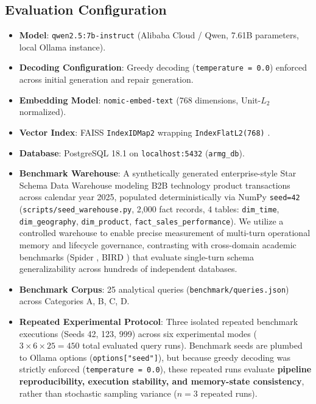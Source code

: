 \documentclass[conference]{IEEEtran}
\begin{document}
\subsection{Evaluation Configuration}
\begin{itemize}
    \item \textbf{Model}: \texttt{qwen2.5:7b-instruct} \cite{qwen2024qwen25} (Alibaba Cloud / Qwen, 7.61B parameters, local Ollama instance).
    \item \textbf{Decoding Configuration}: Greedy decoding (\texttt{temperature = 0.0}) enforced across initial generation and repair generation.
    \item \textbf{Embedding Model}: \texttt{nomic-embed-text} \cite{nussbaum2024nomic} (768 dimensions, Unit-$L_2$ normalized).
    \item \textbf{Vector Index}: FAISS \texttt{IndexIDMap2} wrapping \texttt{IndexFlatL2(768)} \cite{johnson2021faiss}.
    \item \textbf{Database}: PostgreSQL 18.1 on \texttt{localhost:5432} (\texttt{armg\_db}).
    \item \textbf{Benchmark Warehouse}: A synthetically generated enterprise-style Star Schema Data Warehouse modeling B2B technology product transactions across calendar year 2025, populated deterministically via NumPy \texttt{seed=42} (\texttt{scripts/seed\_warehouse.py}, 2,000 fact records, 4 tables: \texttt{dim\_time}, \texttt{dim\_geography}, \texttt{dim\_product}, \texttt{fact\_sales\_performance}). We utilize a controlled warehouse to enable precise measurement of multi-turn operational memory and lifecycle governance, contrasting with cross-domain academic benchmarks (Spider \cite{yu2018spider}, BIRD \cite{li2023bird}) that evaluate single-turn schema generalizability across hundreds of independent databases.
    \item \textbf{Benchmark Corpus}: 25 analytical queries (\texttt{benchmark/queries.json}) across Categories A, B, C, D.
    \item \textbf{Repeated Experimental Protocol}: Three isolated repeated benchmark executions (Seeds 42, 123, 999) across six experimental modes ($3 \times 6 \times 25 = 450$ total evaluated query runs). Benchmark seeds are plumbed to Ollama options (\texttt{options["seed"]}), but because greedy decoding was strictly enforced (\texttt{temperature = 0.0}), these repeated runs evaluate \textbf{pipeline reproducibility, execution stability, and memory-state consistency}, rather than stochastic sampling variance ($n = 3$ repeated runs).

\end{itemize}
\end{document}
